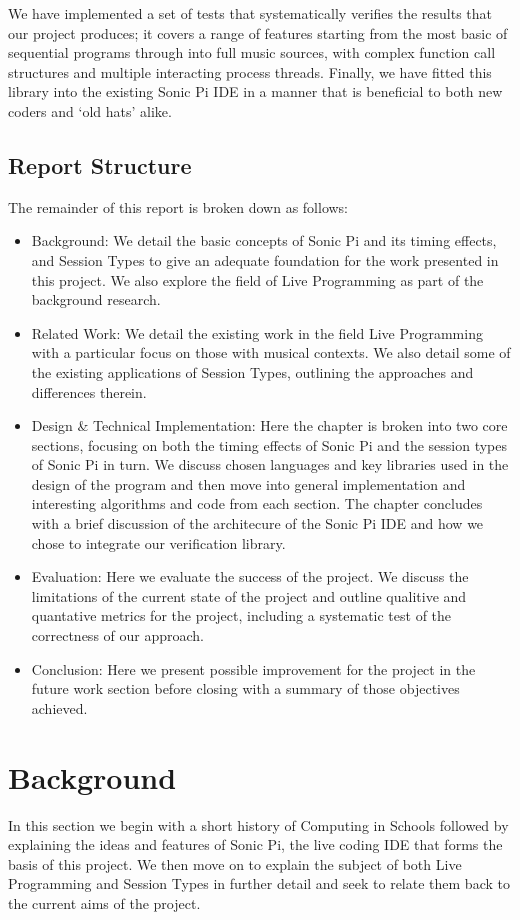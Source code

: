 \documentclass[11pt, abstracton, twoside, titlepage=true]{scrartcl}
\begin{document}
We have implemented a set of tests that systematically verifies the results that
our project produces; it covers a range of features starting from the most basic
of sequential programs through into full music sources, with complex function
call structures and multiple interacting process threads. Finally, we have fitted
this library into the existing Sonic Pi IDE in a manner that is beneficial to both
new coders and `old hats' alike. 

\subsection{Report Structure}
The remainder of this report is broken down as follows:

\begin{itemize}
	\item Background: We detail the basic concepts of Sonic Pi and its timing 
	effects, and Session Types to give an adequate foundation for the work 
	presented in this project. We also explore the field of Live Programming 
	as part of the background research.
	\item Related Work: We detail the existing work in the field Live Programming
	with a particular focus on those with musical contexts. We also detail some
	of the existing applications of Session Types, outlining the approaches and
	differences therein.
	\item Design \& Technical Implementation: Here the chapter is broken into
	two core sections, focusing on both the timing effects of Sonic Pi and
	the session types of Sonic Pi in turn. We discuss chosen languages and key
	libraries used in the design of the program and then move into general
	implementation and interesting algorithms and code from each section. The
	chapter concludes with a brief discussion of the architecure of the Sonic 
	Pi IDE and how we chose to integrate our verification library.
	\item Evaluation: Here we evaluate the success of the project. We discuss
	the limitations of the current state of the project and outline qualitive
	and quantative metrics for the project, including a systematic test of
	the correctness of our approach.
	\item Conclusion: Here we present possible improvement for the project in
	the future work section before closing with a summary of those objectives
	achieved.
\end{itemize}
\newpage

\section{Background}
\thispagestyle{empty}
In this section we begin with a short history of Computing in Schools followed 
by explaining the ideas and features of Sonic Pi, the live coding IDE that forms 
the basis of this project. We then move on to explain the subject of both Live 
Programming and Session Types in further detail and seek to relate them back to 
the current aims of the project.
\end{document}
